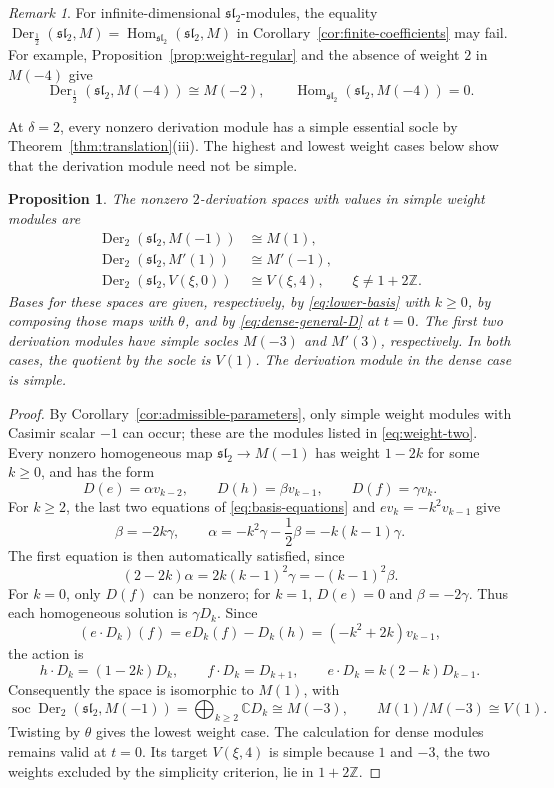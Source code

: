 \documentclass[11pt,reqno]{amsart}
\numberwithin{equation}{section}
\newcommand{\C}{\mathbb C}
\newcommand{\Z}{\mathbb Z}
\newcommand{\s}{\mathfrak{sl}_2}
\DeclareMathOperator{\Der}{Der}
\DeclareMathOperator{\Hom}{Hom}
\DeclareMathOperator{\soc}{soc}
\newtheorem{proposition}[theorem]{Proposition}
\theoremstyle{definition}
\theoremstyle{remark}
\newtheorem{remark}[theorem]{Remark}
\begin{document}
\begin{remark}\label{rem:half-specialization}
For infinite-dimensional \(\s\)-modules, the equality
\(\Der_{\frac{1}{2}}(\s,M)=\Hom_{\s}(\s,M)\) in
Corollary~\ref{cor:finite-coefficients} may fail. For example,
Proposition~\ref{prop:weight-regular} and the absence of weight \(2\)
in \(M(-4)\) give
\[
\Der_{\frac{1}{2}}(\s,M(-4))\cong M(-2),\qquad
\Hom_{\s}(\s,M(-4))=0.
\]
\end{remark}

At \(\delta=2\), every nonzero derivation module has a simple
essential socle by Theorem~\ref{thm:translation}(iii).
The highest and lowest weight cases below show that the derivation
module need not be simple.

\begin{proposition}\label{prop:weight-two}
The nonzero \(2\)-derivation spaces with values in simple weight modules are
\begin{equation}\label{eq:weight-two}
\begin{aligned}
\Der_2(\s,M(-1))&\cong M(1),\\
\Der_2(\s,M'(1))&\cong M'(-1),\\
\Der_2(\s,V(\xi,0))&\cong V(\xi,4),
\qquad \xi\ne1+2\Z.
\end{aligned}
\end{equation}
Bases for these spaces are given, respectively, by \eqref{eq:lower-basis}
with \(k\ge0\), by composing those maps with \(\theta\), and by
\eqref{eq:dense-general-D} at \(t=0\).
The first two derivation modules have simple socles \(M(-3)\) and
\(M'(3)\), respectively. In both cases, the quotient by the socle
is \(V(1)\). The derivation module in the dense case is simple.
\end{proposition}
\begin{proof}
By Corollary~\ref{cor:admissible-parameters}, only simple weight
modules with Casimir scalar \(-1\) can occur; these are the modules
listed in \eqref{eq:weight-two}. Every nonzero homogeneous map
\(\s\to M(-1)\) has weight \(1-2k\) for some \(k\ge0\), and has the form
\[
D(e)=\alpha v_{k-2},\qquad D(h)=\beta v_{k-1},\qquad
D(f)=\gamma v_k.
\]
For \(k\ge2\), the last two equations of \eqref{eq:basis-equations} and
\(ev_k=-k^2v_{k-1}\) give
\[
\beta=-2k\gamma,\qquad
\alpha=-k^2\gamma-\frac{1}{2}\beta=-k(k-1)\gamma.
\]
The first equation is then automatically satisfied, since
\[
(2-2k)\alpha=2k(k-1)^2\gamma=-(k-1)^2\beta.
\]
For \(k=0\), only
\(D(f)\) can be nonzero; for \(k=1\),
\(D(e)=0\) and \(\beta=-2\gamma\).
Thus each homogeneous solution is \(\gamma D_k\).
Since
\[
(e\cdot D_k)(f)=eD_k(f)-D_k(h)
=(-k^2+2k)v_{k-1},
\]
the action is
\[
h\cdot D_k=(1-2k)D_k,\qquad f\cdot D_k=D_{k+1},\qquad
e\cdot D_k=k(2-k)D_{k-1}.
\]
Consequently the space is isomorphic to \(M(1)\), with
\[
\soc\Der_2(\s,M(-1))
=\bigoplus_{k\ge2}\C D_k\cong M(-3),\qquad
M(1)/M(-3)\cong V(1).
\]
Twisting by \(\theta\) gives the lowest weight case. The calculation
for dense modules remains valid at \(t=0\). Its target \(V(\xi,4)\)
is simple because \(1\) and \(-3\), the two weights excluded by
the simplicity criterion, lie in \(1+2\Z\).
\end{proof}
\end{document}
